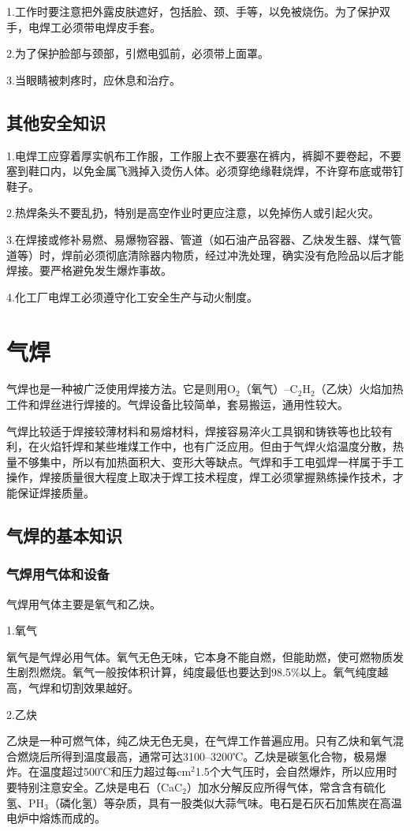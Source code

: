 \documentclass{ctexbook}
\begin{document}
1.工作时要注意把外露皮肤遮好，包括脸、颈、手等，以免被烧伤。为了保护双手，电焊工必须带电焊皮手套。

2.为了保护脸部与颈部，引燃电弧前，必须带上面罩。

3.当眼睛被刺疼时，应休息和治疗。
\subsection{其他安全知识}
1.电焊工应穿着厚实帆布工作服，工作服上衣不要塞在裤内，裤脚不要卷起，不要塞到鞋口内，以免金属飞溅掉入烫伤人体。必须穿绝缘鞋烧焊，不许穿布底或带钉鞋子。

2.热焊条头不要乱扔，特别是高空作业时更应注意，以免掉伤人或引起火灾。

3.在焊接或修补易燃、易爆物容器、管道（如石油产品容器、乙炔发生器、煤气管道等）时，焊前必须彻底清除器内物质，经过冲洗处理，确实没有危险品以后才能焊接。要严格避免发生爆炸事故。

4.化工厂电焊工必须遵守化工安全生产与动火制度。
\section{气焊}
气焊也是一种被广泛使用焊接方法。它是则用O$_2$（氧气）--C$_2$H$_2$（乙炔）火焰加热工件和焊丝进行焊接的。气焊设备比较简单，套易搬运，通用性较大。

气焊比较适于焊接较薄材料和易熔材料，焊接容易淬火工具钢和铸铁等也比较有利，在火焰钎焊和某些堆煤工作中，也有广泛应用。但由于气焊火焰温度分散，热量不够集中，所以有加热面积大、变形大等缺点。气焊和手工电弧焊一样属于手工操作，焊接质量很大程度上取决于焊工技术程度，焊工必须掌握熟练操作技术，才能保证焊接质量。
\subsection{气焊的基本知识}
\subsubsection{气焊用气体和设备}
气焊用气体主要是氧气和乙炔。

1.氧气

氧气是气焊必用气体。氧气无色无味，它本身不能自燃，但能助燃，使可燃物质发生剧烈燃烧。氧气一般按体积计算，纯度最低也要达到98.5\%以上。氧气纯度越高，气焊和切割效果越好。

2.乙炔

乙炔是一种可燃气体，纯乙炔无色无臭，在气焊工作普遍应用。只有乙炔和氧气混合燃烧后所得到温度最高，通常可达3100--3200℃。乙炔是碳氢化合物，极易爆炸。在温度超过500℃和压力超过每cm$^2$1.5个大气压时，会自然爆炸，所以应用时要特别注意安全。乙炔是电石（CaC$_2$）加水分解反应所得气体，常含含有硫化氢、PH$_3$（磷化氢）等杂质，具有一股类似大蒜气味。电石是石灰石加焦炭在高温电炉中熔炼而成的。
\end{document}
